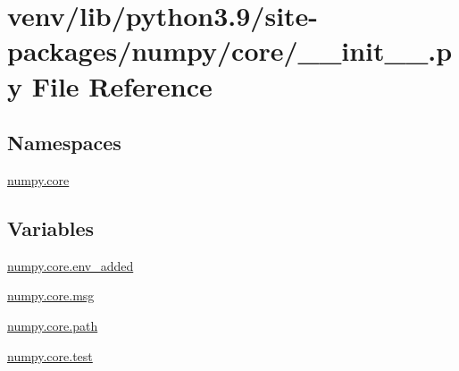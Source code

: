 \hypertarget{venv_2lib_2python3_89_2site-packages_2numpy_2core_2____init_____8py}{}\section{venv/lib/python3.9/site-\/packages/numpy/core/\+\_\+\+\_\+init\+\_\+\+\_\+.py File Reference}
\label{venv_2lib_2python3_89_2site-packages_2numpy_2core_2____init_____8py}
\subsection*{Namespaces}
\begin{DoxyCompactItemize}
\item 
 \hyperlink{namespacenumpy_1_1core}{numpy.\+core}
\end{DoxyCompactItemize}
\subsection*{Variables}
\begin{DoxyCompactItemize}
\item 
\hyperlink{namespacenumpy_1_1core_ade06b973b69ca298b1bdb3dd16b2beea}{numpy.\+core.\+env\+\_\+added}
\item 
\hyperlink{namespacenumpy_1_1core_a208ce5185d73e25a6fd61510ccf391b4}{numpy.\+core.\+msg}
\item 
\hyperlink{namespacenumpy_1_1core_a0d4a95e20828ea3a0657fc49a1edcb08}{numpy.\+core.\+path}
\item 
\hyperlink{namespacenumpy_1_1core_a1d7a801bf76ffacb537556edb42e11a0}{numpy.\+core.\+test}
\end{DoxyCompactItemize}
